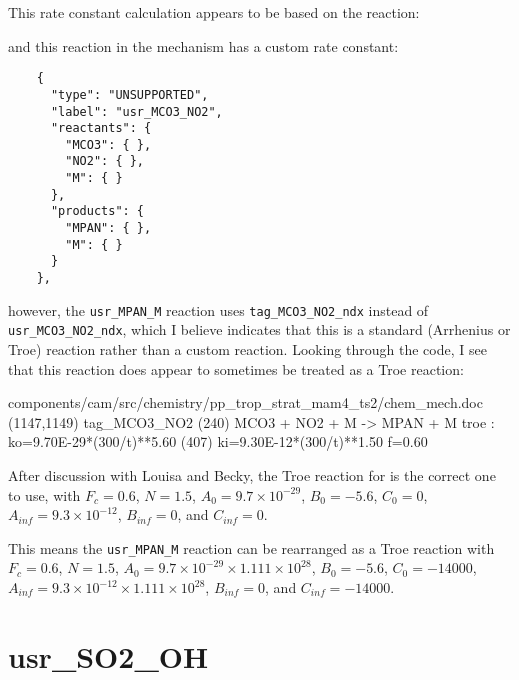 \documentclass[titlepage]{article}
\begin{document}
This rate constant calculation appears to be based on the reaction:
\vspace{20px}


\vspace{20px}
\noindent and this reaction in the mechanism has a custom rate constant:

\begin{verbatim}
    {
      "type": "UNSUPPORTED",
      "label": "usr_MCO3_NO2",
      "reactants": {
        "MCO3": { },
        "NO2": { },
        "M": { }
      },
      "products": {
        "MPAN": { },
        "M": { }
      }
    },
\end{verbatim}

\noindent however, the \verb>usr_MPAN_M> reaction uses \verb>tag_MCO3_NO2_ndx> instead of \verb>usr_MCO3_NO2_ndx>, which I believe indicates that this is a standard (Arrhenius or Troe) reaction rather than a custom reaction. Looking through the code, I see that this reaction does appear to sometimes be treated as a Troe reaction:

\begin{blockcode}[commandchars=\\\{\}]
\color{gray}components/cam/src/chemistry/pp_trop_strat_mam4_ts2/chem_mech.doc (1147,1149)
  tag_MCO3_NO2     (240)   MCO3 + NO2 + M ->  MPAN + M                                          troe : ko=9.70E-29*(300/t)**5.60  (407)
                                                                                                       ki=9.30E-12*(300/t)**1.50
                                                                                                        f=0.60
\end{blockcode}

After discussion with Louisa and Becky, the Troe reaction for  is the correct one to use, with $F_c = 0.6$, $N = 1.5$, $A_0 = 9.7 \times 10^{-29}$, $B_0 = -5.6$, $C_0 = 0$, $A_{inf} = 9.3 \times 10^{-12}$, $B_{inf} = 0$, and $C_{inf} = 0$.

This means the \verb>usr_MPAN_M> reaction can be rearranged as a Troe reaction with $F_c = 0.6$, $N = 1.5$, $A_0 = 9.7 \times 10^{-29} \times 1.111 \times 10^{28}$, $B_0 = -5.6$, $C_0 = -14000$, $A_{inf} = 9.3 \times 10^{-12} \times 1.111 \times 10^{28}$, $B_{inf} = 0$, and $C_{inf} = -14000$.


\section{usr\_SO2\_OH}
\end{document}
